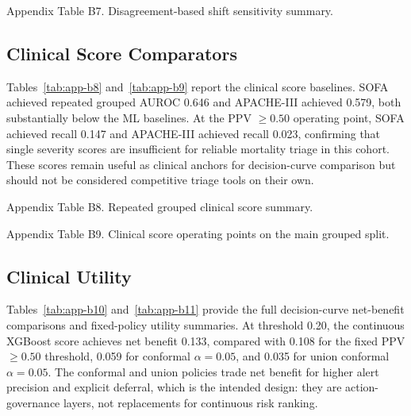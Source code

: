 \begin{appendices}
\begin{table}[!t]
\centering
\scriptsize
\caption{Appendix Table B7. Disagreement-based shift sensitivity summary.}
\label{tab:app-b7}
\begin{adjustbox}{max width=\textwidth}

\end{adjustbox}
\end{table}

\subsection{Clinical Score Comparators}

Tables~\ref{tab:app-b8} and~\ref{tab:app-b9} report the clinical score baselines. SOFA achieved repeated grouped AUROC 0.646 and APACHE-III achieved 0.579, both substantially below the ML baselines. At the PPV $\geq 0.50$ operating point, SOFA achieved recall 0.147 and APACHE-III achieved recall 0.023, confirming that single severity scores are insufficient for reliable mortality triage in this cohort. These scores remain useful as clinical anchors for decision-curve comparison but should not be considered competitive triage tools on their own.

\begin{table}[!t]
\centering
\scriptsize
\caption{Appendix Table B8. Repeated grouped clinical score summary.}
\label{tab:app-b8}
\begin{adjustbox}{max width=\textwidth}

\end{adjustbox}
\end{table}

\begin{table}[!t]
\centering
\scriptsize
\caption{Appendix Table B9. Clinical score operating points on the main grouped split.}
\label{tab:app-b9}
\begin{adjustbox}{max width=\textwidth}

\end{adjustbox}
\end{table}

\subsection{Clinical Utility}

Tables~\ref{tab:app-b10} and~\ref{tab:app-b11} provide the full decision-curve net-benefit comparisons and fixed-policy utility summaries. At threshold 0.20, the continuous XGBoost score achieves net benefit 0.133, compared with 0.108 for the fixed PPV $\geq 0.50$ threshold, 0.059 for conformal $\alpha = 0.05$, and 0.035 for union conformal $\alpha = 0.05$. The conformal and union policies trade net benefit for higher alert precision and explicit deferral, which is the intended design: they are action-governance layers, not replacements for continuous risk ranking.


\end{appendices}
